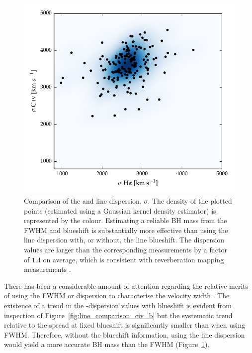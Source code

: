 \begin{figure}[h!]
    \centering 
    \includegraphics[width=0.8\columnwidth]{figures/chapter03/dispersion_comparison.pdf} 
    \caption[{Comparison of the  and \ha line dispersion}]{Comparison of the  and \ha line dispersion, $\sigma$. The density of the plotted points (estimated using a Gaussian kernel density estimator) is represented by the colour. Estimating a reliable BH mass from the  FWHM and blueshift is substantially more effective than using the  line dispersion with, or without, the line blueshift. The  dispersion values are larger than the corresponding \ha measurements by a factor of $1.4$ on average, which is consistent with reverberation mapping measurements \citep{vestergaard06}.} 
    \label{fig:dispersion_comparison}
\end{figure}

There has been a considerable amount of attention regarding the relative merits of using the FWHM or dispersion to characterise the velocity width \citep[e.g.][]{denney13}.
The existence of a trend in the -dispersion values with  blueshift is evident from inspection of Figure~\ref{fig:line_comparison_civ_b} but the systematic trend relative to the spread at fixed blueshift is significantly smaller than when using  FWHM. 
Therefore, without the blueshift information, using the line dispersion would yield a more accurate BH mass than the FWHM (Figure~\ref{fig:dispersion_comparison}). 

